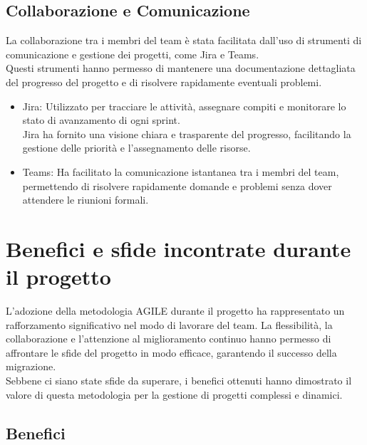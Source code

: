 \subsection{Collaborazione e Comunicazione}
\label{sub:comunicazione}

La collaborazione tra i membri del team è stata facilitata dall'uso di strumenti
di comunicazione e gestione dei progetti, come Jira e Teams.\\ Questi strumenti
hanno permesso di mantenere una documentazione dettagliata del progresso del
progetto e di risolvere rapidamente eventuali problemi.
\begin{itemize}
  \item Jira: Utilizzato per tracciare le attività, assegnare compiti e monitorare
    lo stato di avanzamento di ogni sprint.\\ Jira ha fornito una visione chiara
    e trasparente del progresso, facilitando la gestione delle priorità e l'assegnamento
    delle risorse.

  \item Teams: Ha facilitato la comunicazione istantanea tra i membri del team, permettendo
    di risolvere rapidamente domande e problemi senza dover attendere le riunioni
    formali.
\end{itemize}

\section{Benefici e sfide incontrate durante il progetto}
\label{sec:benefici_sfide_agile}

L'adozione della metodologia AGILE durante il progetto ha rappresentato un rafforzamento
significativo nel modo di lavorare del team. La flessibilità, la collaborazione e
l'attenzione al miglioramento continuo hanno permesso di affrontare le sfide del
progetto in modo efficace, garantendo il successo della migrazione.\\ Sebbene ci
siano state sfide da superare, i benefici ottenuti hanno dimostrato il valore di
questa metodologia per la gestione di progetti complessi e dinamici.

\subsection{Benefici}
\label{sub:benefici}

